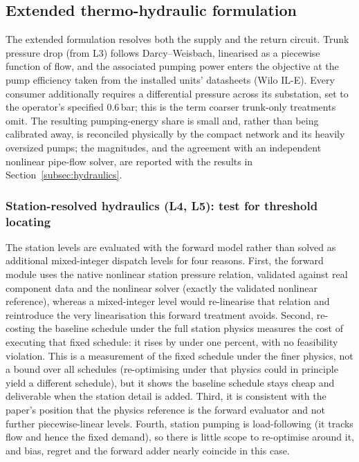 \documentclass[a4paper,fleqn]{cas-sc}
\newcommand{\Lthree}{\ensuremath{\mathrm{L3}}}  %
\newcommand{\new}[1]{\textcolor[HTML]{1A5FB4}{#1}}   %
\newcommand{\new}[1]{#1}
\begin{document}
\subsection{Extended thermo-hydraulic formulation}\label{sec:extended}
\new{}
The extended formulation resolves both the supply and the return circuit. Trunk pressure drop
(from $\Lthree$) follows Darcy--Weisbach, linearised as a piecewise function of flow, and the
associated pumping power enters the objective at the pump efficiency taken from the installed
units' datasheets (Wilo IL-E). Every consumer additionally requires a differential pressure
across its substation, set to the operator's specified $0.6$\,bar; this is the term coarser
trunk-only treatments omit. The resulting pumping-energy share is small and, rather than being
calibrated away, is reconciled physically by the compact network and its heavily oversized pumps;
the magnitudes, and the agreement with an independent nonlinear pipe-flow solver, are reported
with the results in Section~\ref{subsec:hydraulics}.

\subsubsection{Station-resolved hydraulics (L4, L5): test for threshold locating}\label{subsec:stationhyd}
The station levels are evaluated with the forward model rather than solved as additional
mixed-integer dispatch levels for four
reasons. First, the forward module uses the native nonlinear station pressure relation,
validated against real component data and the nonlinear solver (exactly the validated
nonlinear reference), whereas a mixed-integer level would re-linearise
that relation and reintroduce the very linearisation this forward treatment avoids. Second,
re-costing the baseline schedule under the full station physics measures the cost of executing
that fixed schedule: it rises by under one percent, with no feasibility violation. This is a
measurement of the fixed schedule under the finer physics, not a bound over all schedules
(re-optimising under that physics could in principle yield a different schedule), but it shows
the baseline schedule stays cheap and deliverable when the station detail is added. Third, it is consistent with the paper's position that the physics
reference is the forward evaluator and not further piecewise-linear levels. Fourth, station
pumping is load-following (it tracks flow and hence the fixed demand), so there is little scope
to re-optimise around it, and bias, regret and the forward adder nearly coincide in this case.
\end{document}
